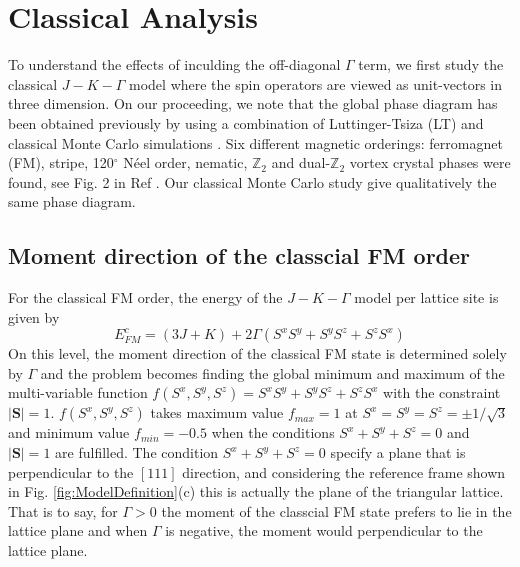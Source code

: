 \documentclass[aps,prb,reprint,groupedaddress,showpacs,amsfonts,amsmath,amssymb,superscriptaddress]{revtex4-1}
\begin{document}
\section{Classical Analysis}
To understand the effects of inculding the off-diagonal $\Gamma$ term, we first study the classical $J-K-\Gamma$ model where the spin operators are viewed as unit-vectors in three dimension. On our proceeding, we note that the global phase diagram has been obtained previously by using a combination of Luttinger-Tsiza (LT) and classical Monte Carlo simulations \cite{PhysRevB.92.165108}. Six different magnetic orderings: ferromagnet (FM), stripe, 120$^\circ$ N\'{e}el order, nematic, $\mathbb{Z}_2$ and dual-$\mathbb{Z}_2$ vortex crystal phases were found, see Fig. 2 in Ref . Our classical Monte Carlo study give qualitatively the same phase diagram.

\subsection{Moment direction of the classcial FM order}
For the classical FM order, the energy of the $J-K-\Gamma$ model per lattice site is given by
\begin{equation}
    E_{FM}^{c} = (3J + K) + 2\Gamma(S^xS^y + S^yS^z + S^zS^x)
    \label{eq:EcFM}
\end{equation}
On this level, the moment direction of the classical FM state is determined solely by $\Gamma$ and the problem becomes finding the global minimum and maximum of the multi-variable function $f(S^x, S^y, S^z) = S^xS^y + S^yS^z + S^zS^x$ with the constraint $|\mathbf{S}| = 1$. $f(S^x, S^y, S^z)$ takes maximum value $f_{max}=1$ at $S^x=S^y=S^z=\pm 1/\sqrt{3}$ and minimum value $f_{min}=-0.5$ when the conditions $S^x + S^y + S^z = 0$ and $|\mathbf{S}| = 1$ are fulfilled. The condition $S^x + S^y + S^z = 0$ specify a plane that is perpendicular to the $[111]$ direction, and considering the reference frame shown in Fig. \ref{fig:ModelDefinition}(c) this is actually the plane of the triangular lattice. That is to say, for $\Gamma > 0$ the moment of the classcial FM state prefers to lie in the lattice plane and when $\Gamma$ is negative, the moment would perpendicular to the lattice plane.
\end{document}
